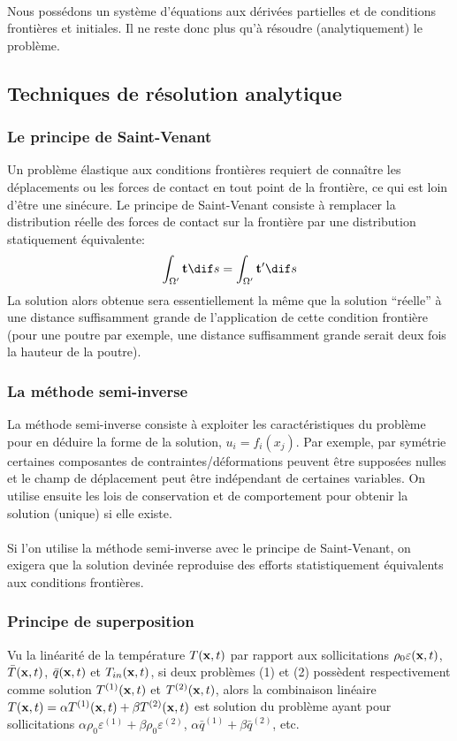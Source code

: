 \paragraph{}
Nous possédons un système d'équations aux dérivées partielles et de conditions frontières et initiales. Il ne reste donc plus qu'à résoudre (analytiquement) le problème.

\subsection{Techniques de résolution analytique}
\subsubsection*{Le principe de Saint-Venant}
Un problème élastique aux conditions frontières requiert de connaître les déplacements ou les forces de contact en tout point de la frontière, ce qui est loin d'être une sinécure. Le principe de Saint-Venant consiste à remplacer la distribution réelle des forces de contact sur la frontière par une distribution statiquement équivalente:
$$\int_{\Omega'}\fv{t} \dif s=\int_{\Omega'}\fv{t}' \dif s$$ La solution alors obtenue sera essentiellement la même que la solution ``réelle'' à une distance suffisamment grande de l'application de cette condition frontière (pour une poutre par exemple, une distance suffisamment grande serait deux fois la hauteur de la poutre).
\subsubsection*{La méthode semi-inverse}
La méthode semi-inverse consiste à exploiter les caractéristiques du problème pour en déduire la forme de la solution, $u_i=f_i(x_j)$. Par exemple, par symétrie certaines composantes de contraintes/déformations peuvent être supposées nulles et le champ de déplacement peut être indépendant de certaines variables. On utilise ensuite les lois de conservation et de comportement pour obtenir la solution (unique) si elle existe.
\paragraph{}
Si l'on utilise la méthode semi-inverse avec le principe de Saint-Venant, on exigera que la solution devinée reproduise des efforts statistiquement équivalents aux conditions frontières.
\subsubsection*{Principe de superposition}
Vu la linéarité de la température $T(\textbf{x},t)$ par rapport aux sollicitations $\rho_0\varepsilon(\textbf{x},t)$, $\bar{T}(\textbf{x},t)$, $\bar{q}(\textbf{x},t)$ et $T_{in}(\textbf{x},t)$, si deux problèmes (1) et (2) possèdent respectivement comme solution $T^{(1)}(\textbf{x},t)$ et $T^{(2)}(\textbf{x},t)$, alors la combinaison linéaire $T(\textbf{x},t)=\alpha T^{(1)}(\textbf{x},t)+\beta T^{(2)}(\textbf{x},t)$ est solution du problème ayant pour sollicitations $\alpha\rho_0\varepsilon^{(1)}+\beta\rho_0\varepsilon^{(2)}$, $\alpha\bar{q}^{(1)}+\beta\bar{q}^{(2)}$, etc.
